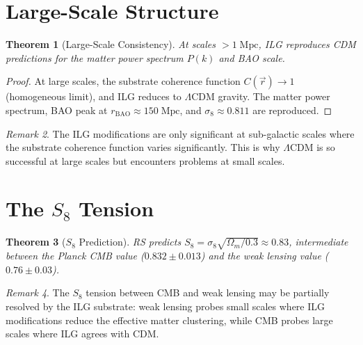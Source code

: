 \documentclass[12pt,a4paper]{article}
\newtheorem{theorem}{Theorem}[section]
\theoremstyle{definition}
\theoremstyle{remark}
\newtheorem{remark}[theorem]{Remark}
\begin{document}
\section{Large-Scale Structure}
\label{sec:large-scale}

\begin{theorem}[Large-Scale Consistency]
At scales $> 1\;\mathrm{Mpc}$, ILG reproduces CDM predictions for
the matter power spectrum $P(k)$ and BAO scale.
\end{theorem}

\begin{proof}
At large scales, the substrate coherence function
$C(\vec{r}) \to 1$ (homogeneous limit), and ILG reduces to
$\Lambda$CDM gravity.  The matter power spectrum, BAO peak at
$r_{\mathrm{BAO}} \approx 150\;\mathrm{Mpc}$, and
$\sigma_8 \approx 0.811$ are reproduced.
\end{proof}

\begin{remark}
The ILG modifications are only significant at sub-galactic scales
where the substrate coherence function varies significantly.  This
is why $\Lambda$CDM is so successful at large scales but encounters
problems at small scales.
\end{remark}

\section{The $S_8$ Tension}
\label{sec:s8}

\begin{theorem}[$S_8$ Prediction]
RS predicts $S_8 = \sigma_8\sqrt{\Omega_m/0.3} \approx 0.83$,
intermediate between the Planck CMB value ($0.832 \pm 0.013$)
and the weak lensing value ($0.76 \pm 0.03$).
\end{theorem}

\begin{remark}
The $S_8$ tension between CMB and weak lensing may be partially
resolved by the ILG substrate: weak lensing probes small scales
where ILG modifications reduce the effective matter clustering,
while CMB probes large scales where ILG agrees with CDM.
\end{remark}

\end{document}
